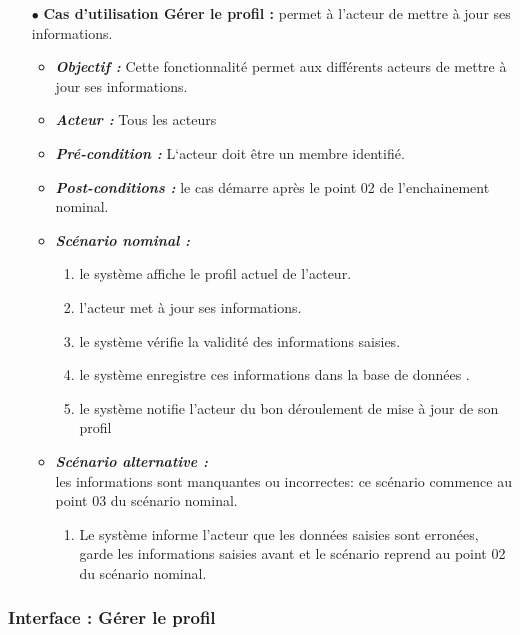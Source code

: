 \begin{itemize}
	
	\item[$\bullet$] \textbf{Cas d’utilisation Gérer le profil :} permet à l’acteur de mettre à jour ses informations.
	\medskip
	\begin{itemize}
		\item \textit{\textbf{Objectif :}}  Cette fonctionnalité permet aux différents acteurs de mettre à jour ses informations. 
		
		\item \textit{\textbf{Acteur :}} Tous les acteurs
		
		\item \textit{\textbf{Pré-condition  :}}  L‘acteur doit être un membre identifié.
		\item \textit{\textbf{Post-conditions   :}} le cas démarre après le point 02 de l’enchainement nominal.
		\item \textit{\textbf{Scénario nominal :}}
		\begin{enumerate}
			\item le système affiche le profil actuel de l’acteur. 
			\item l’acteur met à jour ses informations. 
			\item  le système vérifie la validité des informations saisies.  
			\item  le système enregistre ces informations dans la base de données .  
			\item le système notifie l’acteur du bon déroulement de mise à jour de son profil
		\end{enumerate}
		\item \textit{\textbf{Scénario alternative :}} \\
			les informations sont manquantes ou incorrectes: ce scénario commence au point 03 du
		scénario nominal.
		\begin{enumerate}
		
			\item Le système informe l’acteur que les données saisies sont erronées, garde les informations
			saisies avant et le scénario reprend au point 02 du scénario nominal. 
		\end{enumerate}
	\end{itemize}
\end{itemize}	
	\bigskip


\subsubsection{ Interface : Gérer le profil  }


